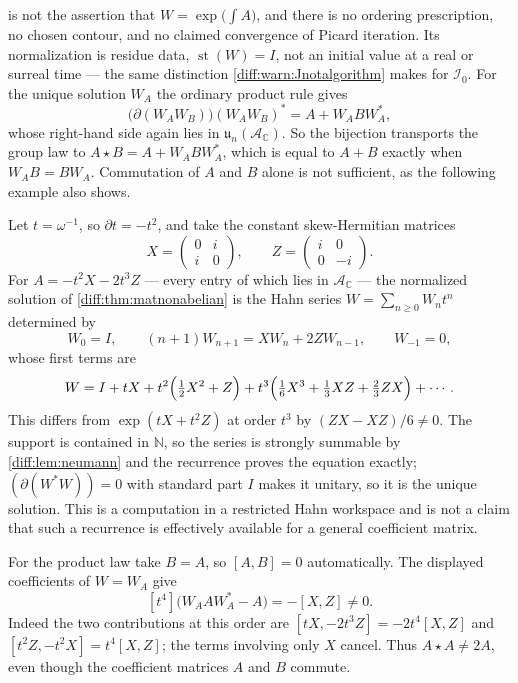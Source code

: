 \documentclass[11pt,letterpaper]{article}
\numberwithin{equation}{section}
\theoremstyle{definition}
\theoremstyle{remark}
\newcommand{\C}{\mathbb C}
\newcommand{\N}{\mathbb N}
\newcommand{\der}{\partial}
\newcommand{\Acl}{\mathcal A}
\newcommand{\Izero}{\mathcal I_{0}}
\newcommand{\st}{\operatorname{st}}
\begin{document}
\begin{warning}
\label{diff:warn:matnonabelian}
 is not the assertion that
$W=\exp\bigl(\int A\bigr)$, and there is no ordering prescription, no chosen
contour, and no claimed convergence of Picard iteration. Its normalization is
residue data, $\st(W)=I$, not an initial value at a real or surreal time ---
the same distinction \cref{diff:warn:Jnotalgorithm} makes for $\Izero$. For the
unique solution $W_{A}$ the ordinary product rule gives
\begin{equation}\label{diff:eq:matcocycle}
 \bigl(\der(W_{A}W_{B})\bigr)(W_{A}W_{B})^{*}
 =A+W_{A}BW_{A}^{*},
\end{equation}
whose right-hand side again lies in $\mathfrak u_{n}(\Acl_{\C})$. So the
bijection transports the group law to $A\star B=A+W_{A}BW_{A}^{*}$, which is
equal to $A+B$ exactly when $W_{A}B=BW_{A}$. Commutation of $A$ and $B$
alone is not sufficient, as the following example also shows.
\end{warning}

\begin{example}
\label{diff:ex:matnoncommuting}
Let $t=\omega^{-1}$, so $\der t=-t^{2}$, and take the constant skew-Hermitian
matrices
\[
 X=\begin{pmatrix}0&i\\i&0\end{pmatrix},
 \qquad
 Z=\begin{pmatrix}i&0\\0&-i\end{pmatrix} .
\]
For $A=-t^{2}X-2t^{3}Z$ --- every entry of which lies in $\Acl_{\C}$ --- the
normalized solution of \cref{diff:thm:matnonabelian} is the Hahn series
$W=\sum_{n\geq0}W_{n}t^{n}$ determined by
\begin{equation}\label{diff:eq:matnoncommrec}
 W_{0}=I,
 \qquad
 (n+1)W_{n+1}=XW_{n}+2ZW_{n-1},
 \qquad W_{-1}=0 ,
\end{equation}
whose first terms are
\[
 W=I+tX+t^{2}\Bigl(\tfrac12X^{2}+Z\Bigr)
   +t^{3}\Bigl(\tfrac16X^{3}+\tfrac13XZ+\tfrac23ZX\Bigr)+\cdots .
\]
This differs from $\exp(tX+t^{2}Z)$ at order $t^{3}$ by
$(ZX-XZ)/6\neq0$. The support is contained in $\N$, so the series is strongly
summable by \cref{diff:lem:neumann} and the recurrence proves the equation
exactly; $(\der(W^{*}W))=0$ with standard part $I$ makes it unitary, so it is
the unique solution. This is a computation in a restricted Hahn workspace and
is not a claim that such a recurrence is effectively available for a general
coefficient matrix.

For the product law take $B=A$, so $[A,B]=0$ automatically. The displayed
coefficients of $W=W_A$ give
\[
 [t^{4}]\bigl(W_A A W_A^{*}-A\bigr)=-[X,Z]\neq0.
\]
Indeed the two contributions at this order are
$[tX,-2t^{3}Z]=-2t^{4}[X,Z]$ and
$[t^{2}Z,-t^{2}X]=t^{4}[X,Z]$; the terms involving only $X$ cancel.
Thus $A\star A\neq2A$, even though the coefficient matrices $A$ and $B$
commute.
\end{example}
\end{document}

